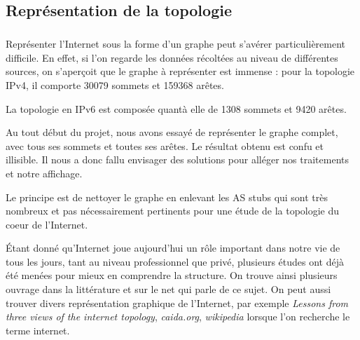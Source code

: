 
% 

\subsection{Repr\'esentation de la topologie}
\subparagraph{}
Repr\'esenter l'Internet sous la forme d'un graphe peut s'av\'erer particulièrement difficile. En effet, si l'on regarde les donn\'ees r\'ecolt\'ees au niveau de diff\'erentes sources, on s'aperçoit que le graphe \`a repr\'esenter est immense : pour la topologie IPv4, il comporte 30079 sommets et 159368 ar\^etes.
\par
La topologie en IPv6 est compos\'ee quant\`a elle de 1308 sommets et 9420 ar\^etes.

\par
Au tout d\'ebut du projet, nous avons essayé de repr\'esenter le graphe complet, avec tous ses sommets et toutes ses ar\^etes. Le r\'esultat obtenu est confu et illisible. Il nous a donc fallu envisager des solutions pour all\'eger nos traitements et notre affichage.
\par
Le principe est de nettoyer le graphe en enlevant les AS stubs qui sont tr\`es nombreux et pas nécessairement pertinents pour une \'etude de la topologie du coeur de l'Internet. 
\par
\'Etant donn\'e qu'Internet joue aujourd'hui un r\^ole important dans notre vie de tous les jours, tant au niveau professionnel que priv\'e, plusieurs \'etudes ont d\'ej\`a \'et\'e men\'ees pour mieux en comprendre la structure.
On trouve ainsi plusieurs ouvrage dans la litt\'erature et sur le net qui parle de ce sujet. On peut aussi trouver divers repr\'esentation graphique de l'Internet, par exemple \textit{Lessons from three views of the internet topology}, \textit{caida.org}, \textit{wikipedia} lorsque l'on recherche le terme internet.

%